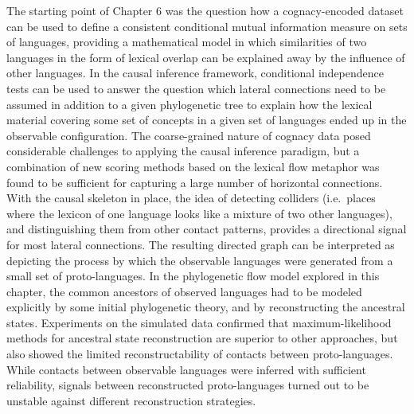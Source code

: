 The starting point of Chapter 6 was the question how a cognacy-encoded dataset can be used to define a consistent conditional mutual information measure on sets of languages, providing a mathematical model in which similarities of two languages in the form of lexical overlap can be explained away by the influence of other languages. In the causal inference framework, conditional independence tests can be used to answer the question which lateral connections need to be assumed in addition to a given phylogenetic tree to explain how the lexical material covering some set of concepts in a given set of languages ended up in the observable configuration. The coarse-grained nature of cognacy data posed considerable challenges to applying the causal inference paradigm, but a combination of new scoring methods based on the lexical flow metaphor was found to be sufficient for capturing a large number of horizontal connections. With the causal skeleton in place, the idea of detecting colliders (i.e.\ places where the 
lexicon of one language looks like a mixture of two other languages), and distinguishing them from other contact patterns, provides a directional signal for most lateral connections. The resulting directed graph can be interpreted as depicting the process by which the observable languages were generated from a small set of proto-languages. In the phylogenetic flow model explored in this chapter, the common ancestors of observed languages had to be modeled explicitly by some initial phylogenetic theory, and by reconstructing the ancestral states. Experiments on the simulated data confirmed that maximum-likelihood methods for ancestral state reconstruction are superior to other approaches, but also showed the limited reconstructability of contacts between proto-languages. While contacts between observable languages were inferred with sufficient reliability, signals between reconstructed proto-languages turned out to be unstable against different reconstruction strategies.

